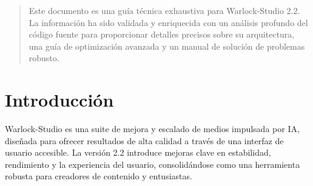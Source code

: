 \documentclass[11pt, a4paper]{article}
\begin{document}
\pagestyle{fancy} %

\begin{abstract}
\noindent %
Este documento es una guía técnica exhaustiva para Warlock-Studio 2.2. La información ha sido validada y enriquecida con un análisis profundo del código fuente para proporcionar detalles precisos sobre su arquitectura, una guía de optimización avanzada y un manual de solución de problemas robusto.
\end{abstract}

\newpage %
\tableofcontents %
\newpage %



\section{Introducción}
Warlock-Studio es una suite de mejora y escalado de medios impulsada por IA, diseñada para ofrecer resultados de alta calidad a través de una interfaz de usuario accesible. La versión 2.2 introduce mejoras clave en estabilidad, rendimiento y la experiencia del usuario, consolidándose como una herramienta robusta para creadores de contenido y entusiastas.
\end{document}
